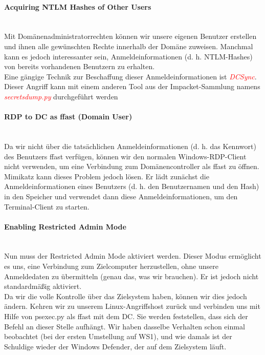 \paragraph{Acquiring NTLM Hashes of Other Users}\mbox{} \\
Mit Domänenadministratorrechten können wir unsere eigenen Benutzer erstellen und ihnen alle gewünschten Rechte innerhalb der Domäne zuweisen. Manchmal kann es jedoch interessanter sein, Anmeldeinformationen (d. h. NTLM-Hashes) von bereits vorhandenen Benutzern zu erhalten.\\

Eine gängige Technik zur Beschaffung dieser Anmeldeinformationen ist \textcolor{red}{\textit{DCSync}}.\\
Dieser Angriff kann mit einem anderen Tool aus der Impacket-Sammlung namens \textcolor{red}{\textit{secretsdump.py}} durchgeführt werden

\paragraph{RDP to DC as ffast (Domain User)}\mbox{} \\
Da wir nicht über die tatsächlichen Anmeldeinformationen (d. h. das Kennwort) des Benutzers ffast verfügen, können wir den normalen Windows-RDP-Client nicht verwenden, um eine Verbindung zum Domänencontroller als ffast zu öffnen.\\

Mimikatz kann dieses Problem jedoch lösen. Er lädt zunächst die Anmeldeinformationen eines Benutzers (d. h. den Benutzernamen und den Hash) in den Speicher und verwendet dann diese Anmeldeinformationen, um den Terminal-Client zu starten.

\paragraph{Enabling Restricted Admin Mode}\mbox{} \\
Nun muss der Restricted Admin Mode aktiviert werden. Dieser Modus ermöglicht es uns, eine Verbindung zum Zielcomputer herzustellen, ohne unsere Anmeldedaten zu übermitteln (genau das, was wir brauchen). Er ist jedoch nicht standardmäßig aktiviert.\\
Da wir die volle Kontrolle über das Zielsystem haben, können wir dies jedoch ändern. Kehren wir zu unserem Linux-Angriffshost zurück und verbinden uns mit Hilfe von psexec.py als ffast mit dem DC.
Sie werden feststellen, dass sich der Befehl an dieser Stelle aufhängt. Wir haben dasselbe Verhalten schon einmal beobachtet (bei der ersten Umstellung auf WS1), und wie damals ist der Schuldige wieder der Windows Defender, der auf dem Zielsystem läuft.\\

